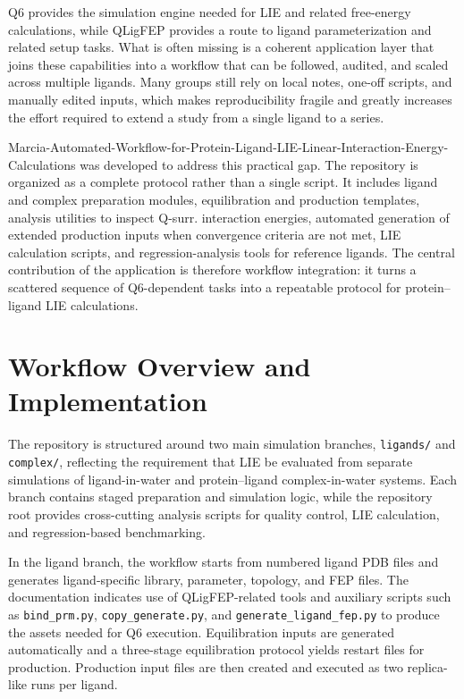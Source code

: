 \documentclass[journal=jcisd8,manuscript=article]{achemso}
\begin{document}
Q6 provides the simulation engine needed for LIE and related free-energy calculations,\cite{bauer2018q6} while QLigFEP provides a route to ligand parameterization and related setup tasks. What is often missing is a coherent application layer that joins these capabilities into a workflow that can be followed, audited, and scaled across multiple ligands. Many groups still rely on local notes, one-off scripts, and manually edited inputs, which makes reproducibility fragile and greatly increases the effort required to extend a study from a single ligand to a series.

Marcia-Automated-Workflow-for-Protein-Ligand-LIE-Linear-Interaction-Energy-Calculations was developed to address this practical gap. The repository is organized as a complete protocol rather than a single script. It includes ligand and complex preparation modules, equilibration and production templates, analysis utilities to inspect Q-surr. interaction energies, automated generation of extended production inputs when convergence criteria are not met, LIE calculation scripts, and regression-analysis tools for reference ligands. The central contribution of the application is therefore workflow integration: it turns a scattered sequence of Q6-dependent tasks into a repeatable protocol for protein--ligand LIE calculations.

\section{Workflow Overview and Implementation}

The repository is structured around two main simulation branches, \texttt{ligands/} and \texttt{complex/}, reflecting the requirement that LIE be evaluated from separate simulations of ligand-in-water and protein--ligand complex-in-water systems. Each branch contains staged preparation and simulation logic, while the repository root provides cross-cutting analysis scripts for quality control, LIE calculation, and regression-based benchmarking.

In the ligand branch, the workflow starts from numbered ligand PDB files and generates ligand-specific library, parameter, topology, and FEP files. The documentation indicates use of QLigFEP-related tools and auxiliary scripts such as \texttt{bind\_prm.py}, \texttt{copy\_generate.py}, and \texttt{generate\_ligand\_fep.py} to produce the assets needed for Q6 execution. Equilibration inputs are generated automatically and a three-stage equilibration protocol yields restart files for production. Production input files are then created and executed as two replica-like runs per ligand.
\end{document}
